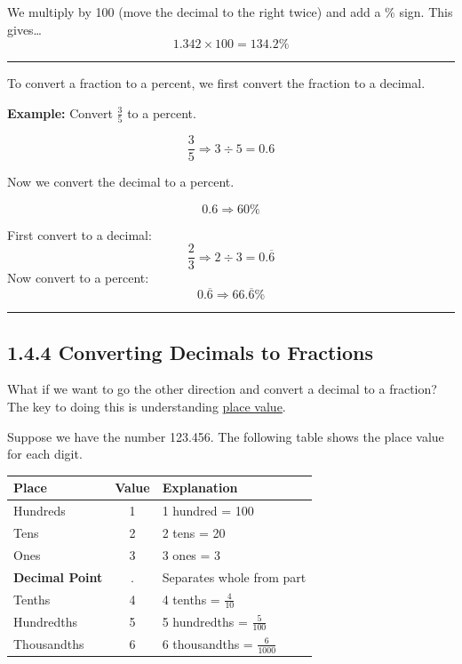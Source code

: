 \documentclass[
  letterpaper,
  DIV=11,
  numbers=noendperiod]{scrreprt}
\begin{document}
We multiply by 100 (move the decimal to the right twice) and add a \%
sign. This gives\ldots{} \[1.342 \times 100 = 134.2\%\]

\begin{center}\rule{0.5\linewidth}{0.5pt}\end{center}

To convert a fraction to a percent, we first convert the fraction to a
decimal.

\textbf{Example:} Convert \(\frac{3}{5}\) to a percent.

\[
\frac{3}{5} \Rightarrow 3 \div 5 = 0.6
\]

Now we convert the decimal to a percent.

\[0.6 \Rightarrow 60\%\]

First convert to a decimal: \[
\frac{2}{3} \Rightarrow 2 \div 3 = 0.\overline{6}
\] Now convert to a percent: \[
0.\overline{6} \Rightarrow 66.\overline{6}\%
\]

\begin{center}\rule{0.5\linewidth}{0.5pt}\end{center}

\subsection*{1.4.4 Converting Decimals to
Fractions}\label{converting-decimals-to-fractions}

What if we want to go the other direction and convert a decimal to a
fraction? The key to doing this is understanding
\href{./glossary.html\#glossary-place-value}{place value}.

Suppose we have the number 123.456. The following table shows the place
value for each digit.

\begin{longtable}[]{@{}lcl@{}}
\toprule\noalign{}
Place & Value & Explanation \\
\midrule\noalign{}
\endhead
\bottomrule\noalign{}
\endlastfoot
Hundreds & 1 & 1 hundred = 100 \\
Tens & 2 & 2 tens = 20 \\
Ones & 3 & 3 ones = 3 \\
\textbf{Decimal Point} & . & Separates whole from part \\
Tenths & 4 & 4 tenths = \(\frac{4}{10}\) \\
Hundredths & 5 & 5 hundredths = \(\frac{5}{100}\) \\
Thousandths & 6 & 6 thousandths = \(\frac{6}{1000}\) \\
\end{longtable}
\end{document}

